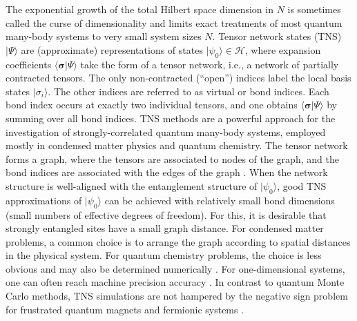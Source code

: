 \documentclass[english,11pt,aps,pra,onecolumn,tightenlines,groupedaddress,superscriptaddress,notitlepage,floatfix,fleqn]{revtex4-1}
\newcommand{\bra}{\langle}
\newcommand{\ket}{\rangle}
\renewcommand{\vec}[1]{{\boldsymbol{#1}}}
\newcommand{\vs}{\vec{\sigma}}
\newcommand{\mc}[1]{\mathcal{#1}}
\renewcommand{\H}{\mc{H}}
\begin{document}
The exponential growth of the total Hilbert space dimension in $N$ is sometimes called the curse of dimensionality and limits exact treatments of most quantum many-body systems to very small system sizes $N$.
Tensor network states (TNS) $|\Psi\ket$ are (approximate) representations of states $|\psi_0\ket\in\H$, where expansion coefficients $\bra\vs|\Psi\ket$ take the form of a tensor network, i.e., a network of partially contracted tensors. The only non-contracted (``open'') indices label the local basis states $|\sigma_i\ket$. The other indices are referred to as virtual or bond indices. Each bond index occurs at exactly two individual tensors, and one obtains $\bra\vs|\Psi\ket$ by summing over all bond indices. TNS methods are a powerful approach for the investigation of strongly-correlated quantum many-body systems, employed mostly in condensed matter physics and quantum chemistry. The tensor network forms a graph, where the tensors are associated to nodes of the graph, and the bond indices are associated with the edges of the graph \cite{Orus2014-349}. When the network structure is well-aligned with the entanglement structure of $|\psi_0\ket$, good TNS approximations of $|\psi_0\ket$ can be achieved with relatively small bond dimensions (small numbers of effective degrees of freedom). For this, it is desirable that strongly entangled sites have a small graph distance. For condensed matter problems, a common choice is to arrange the graph according to spatial distances in the physical system. For quantum chemistry problems, the choice is less obvious and may also be determined numerically \cite{Legeza2003-68,Chan2002-116,Rissler2006-323,Krumnow2016-117}.
For one-dimensional systems, one can often reach machine precision accuracy \cite{White1992-11,White1993-10,Schollwoeck2005,Hastings2007-08,Verstraete2005-5,Landau2015-11,Barthel2017_08}. In contrast to quantum Monte Carlo methods, TNS simulations are not hampered by the negative sign problem \cite{Loh1990-41,Chandrasekharan1999-83,Troyer2005} for frustrated quantum magnets and fermionic systems \cite{Barthel2009-80,Corboz2009-80,Pineda2009_05,Kraus2009_04,Corboz2009_04}.
\end{document}
